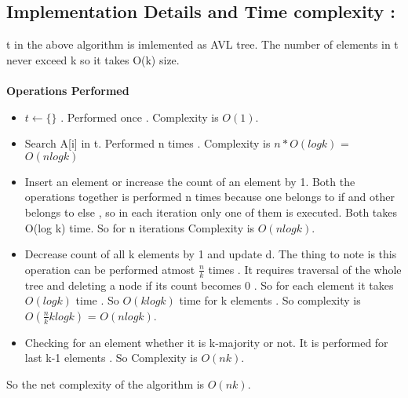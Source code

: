 \documentclass[11pt]{article}
\begin{document}
\subsection*{ Implementation Details and Time complexity :} 
t in the above algorithm is imlemented as AVL tree. The number of elements in t never exceed k so it takes O(k) size. \\ \\
\textbf{Operations Performed}
\begin{itemize}
\item $t \leftarrow \lbrace \rbrace$ . Performed once . Complexity is $O(1)$.
\item Search A[i] in t. Performed n times . Complexity is $n*O(log k)$ = $O(nlog k)$
\item Insert an element or increase the count of an element by 1. Both the operations together is performed n times because one belongs to if and other belongs to else , so in each iteration  only one of them is executed. Both takes O(log k) time. So for n iterations Complexity is $O(nlog k)$.
\item Decrease count of all k elements by 1 and update d. The thing to note is this operation can be performed atmost $\frac{n}{k}$ times . It requires traversal of the whole tree and deleting a node if its count becomes 0 . So for each element it takes $O(log k)$ time . So $O(k log k)$ time for k elements . So complexity is $O(\frac{n}{k}klog k)$ = $O(nlog k)$. 
\item Checking for an element whether it is k-majority or not. It is performed for last k-1 elements . So Complexity is $O(nk)$.
\end{itemize}
So the net complexity of the algorithm is $O(nk)$.
\end{document}
